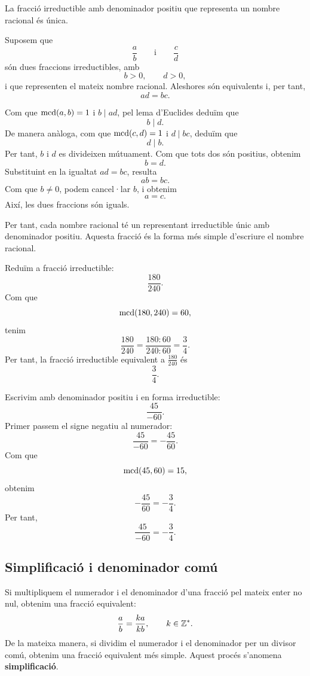 \begin{proposicio}
	La fracció irreductible amb denominador positiu que representa un nombre racional és única.
\end{proposicio}

\begin{prova}
	Suposem que
	\[
	\frac{a}{b}
	\qquad\text{i}\qquad
	\frac{c}{d}
	\]
	són dues fraccions irreductibles, amb
	\[
	b>0,\qquad d>0,
	\]
	i que representen el mateix nombre racional. Aleshores són equivalents i, per tant,
	\[
	ad=bc.
	\]
	
	Com que \(\operatorname{mcd}(a,b)=1\) i \(b\mid ad\), pel lema d'Euclides deduïm que
	\[
	b\mid d.
	\]
	De manera anàloga, com que \(\operatorname{mcd}(c,d)=1\) i \(d\mid bc\), deduïm que
	\[
	d\mid b.
	\]
	Per tant, \(b\) i \(d\) es divideixen mútuament. Com que tots dos són positius, obtenim
	\[
	b=d.
	\]
	Substituint en la igualtat \(ad=bc\), resulta
	\[
	ab=bc.
	\]
	Com que \(b\neq0\), podem cancel·lar \(b\), i obtenim
	\[
	a=c.
	\]
	Així, les dues fraccions són iguals.
\end{prova}

Per tant, cada nombre racional té un representant irreductible únic amb denominador positiu. Aquesta fracció és la forma més simple d'escriure el nombre racional.

\begin{exemple}
	Reduïm a fracció irreductible:
	\[
	\frac{180}{240}.
	\]
	Com que
	\[
	\operatorname{mcd}(180,240)=60,
	\]
	tenim
	\[
	\frac{180}{240}
	=
	\frac{180:60}{240:60}
	=
	\frac{3}{4}.
	\]
	Per tant, la fracció irreductible equivalent a \(\frac{180}{240}\) és
	\[
	\frac{3}{4}.
	\]
\end{exemple}

\begin{exemple}
	Escrivim amb denominador positiu i en forma irreductible:
	\[
	\frac{45}{-60}.
	\]
	Primer passem el signe negatiu al numerador:
	\[
	\frac{45}{-60}
	=
	-\frac{45}{60}.
	\]
	Com que
	\[
	\operatorname{mcd}(45,60)=15,
	\]
	obtenim
	\[
	-\frac{45}{60}
	=
	-\frac{3}{4}.
	\]
	Per tant,
	\[
	\frac{45}{-60}
	=
	-\frac{3}{4}.
	\]
\end{exemple}

\subsection{Simplificació i denominador comú}

Si multipliquem el numerador i el denominador d'una fracció pel mateix enter no nul, obtenim una fracció equivalent:
\[
\frac{a}{b}
=
\frac{ka}{kb},
\qquad k\in\mathbb{Z}^{*}.
\]
De la mateixa manera, si dividim el numerador i el denominador per un divisor comú, obtenim una fracció equivalent més simple. Aquest procés s'anomena \textbf{simplificació}.

